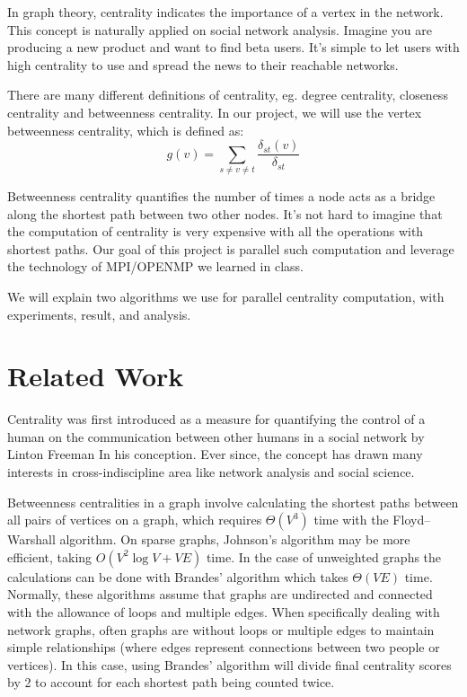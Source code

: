 \documentclass[11pt,a4paper,twocolumn,titlepage]{article}
\begin{document}
In graph theory, centrality indicates the importance of a vertex in the
network. This concept is naturally applied on social network analysis. Imagine
you are producing a new product and want to find beta users. It's simple to let
users with high centrality to use and spread the news to their reachable
networks.

There are many different definitions of centrality, eg. degree centrality,
closeness centrality and betweenness centrality. In our project, we will use
the vertex betweenness centrality, which is defined as:
\[ g(v) = \sum_{s\neq v \neq t}{\frac{\delta_{st}(v)}{\delta_{st}}} \]

Betweenness centrality quantifies the number of times a node acts as a bridge
along the shortest path between two other nodes. It's not hard to imagine that
the computation of centrality is very expensive with all the operations with
shortest paths. Our goal of this project is parallel such computation and
leverage the technology of MPI/OPENMP we learned in class.

We will explain two algorithms we use for parallel centrality computation, with
experiments, result, and analysis. 


\section{Related Work} %
\label{sec:related-work}

Centrality was first introduced as a measure for quantifying the control of a
human on the communication between other humans in a social network by Linton
Freeman\cite{burt2009structural} In his conception. Ever since, the concept has
drawn many interests in cross-indiscipline area like network analysis and
social science.

Betweenness centralities in a graph involve calculating the shortest paths
between all pairs of vertices on a graph, which requires $\Theta(V^3)$ time
with the Floyd–Warshall\cite{Cormen:2001:IA:580470} algorithm. On sparse
graphs, Johnson's\cite{johnson1977efficient} algorithm may be more efficient,
taking $O(V^2 \log V + V E)$ time. In the case of unweighted graphs the
calculations can be done with Brandes' algorithm\cite{brandes2001faster} which
takes $\Theta(VE)$ time. Normally, these algorithms assume that graphs are
undirected and connected with the allowance of loops and multiple edges. When
specifically dealing with network graphs, often graphs are without loops or
multiple edges to maintain simple relationships (where edges represent
connections between two people or vertices). In this case, using Brandes'
algorithm will divide final centrality scores by 2 to account for each shortest
path being counted twice.
\end{document}

